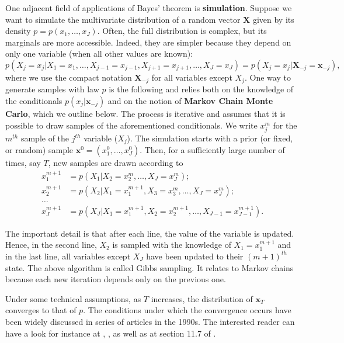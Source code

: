 One adjacent field of applications of Bayes' theorem is \textbf{simulation}. Suppose we want to simulate the multivariate distribution of a random vector $\textbf{X}$ given by its density $p=p(x_1,\dots,x_J)$. Often, the full distribution is complex, but its marginals are more accessible. Indeed, they are simpler because they depend on only one variable (when all other values are known):
\begin{equation}
p(X_j=x_j|X_1= x_1,\dots,X_{j-1}=x_{j-1},X_{j+1}=x_{j+1},\dots,X_J=x_J)=p(X_j=x_j|\textbf{X}_{-j}=\textbf{x}_{-j}),
\end{equation}
where we use the compact notation $\textbf{X}_{ -j}$ for all variables except $X_j$. One way to generate samples with law $p$ is the following and relies both on the knowledge of the conditionals $p(x_j|\textbf{x}_{ -j})$ and on the notion of \textbf{Markov Chain Monte Carlo}, which we outline below. The process is iterative and assumes that it is possible to draw samples of the aforementioned conditionals. We write $x_j^{m}$ for the $m^{th}$ sample of the $j^{th}$ variable ($X_j$). The simulation starts with a prior (or fixed, or random) sample $\textbf{x}^0=(x^0_1,\dots,x^0_J)$. Then, for a sufficiently large number of times, say $T$, new samples are drawn according to
\begin{align*}
x_1^{m+1} &= p(X_1|X_2=x_2^{m}, \dots ,X_J=x_J^m) ;\\
x_2^{m+1} &=p(X_2|X_1=x_1^{m+1}, X_3=x^{m}_3, \dots, X_J=x_J^m); \\
\dots& \\
x_J^{m+1}&= p(X_J|X_1=x_1^{m+1}, X_2=x_2^{m+1}, \dots, X_{J-1}=x_{J-1}^{m+1}).
\end{align*}

The important detail is that after each line, the value of the variable is updated. Hence, in the second line, $X_2$ is sampled with the knowledge of $X_1=x_1^{m+1}$ and in the last line, all variables except $X_J$ have been updated to their $(m+1)^{th}$ state. The above algorithm is called Gibbs sampling. It relates to Markov chains because each new iteration depends only on the previous one.

Under some technical assumptions, as $T$ increases, the distribution of $\textbf{x}_T$ converges to that of $p$. The conditions under which the convergence occurs have been widely discussed in series of articles in the 1990s. The interested reader can have a look for instance at \cite{tierney1994markov}, \cite{roberts1994simple}, as well as at section 11.7 of \cite{gelman2013bayesian}.


